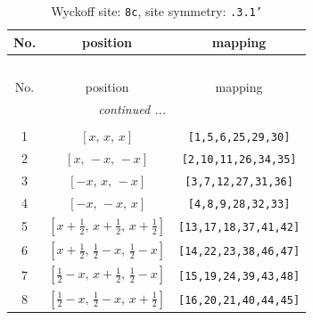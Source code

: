 \documentclass[fleqn,8pt]{jsarticle}
\begin{document}
\renewcommand{\arraystretch}{1.2}
\begin{longtable}{ccc}
\caption{Wyckoff site: {\tt 8c}, site symmetry: {\tt .3.1'}}
 \\
 \hline \hline
No. & position & mapping \\ \hline \endfirsthead

\multicolumn{2}{l}{\tablename\ \thetable{}} \\
 \hline \hline
No. & position & mapping \\ \hline \endhead

 \hline \hline
\multicolumn{2}{r}{\footnotesize\it continued ...} \\ \endfoot

 \hline \hline
\multicolumn{2}{r}{} \\ \endlastfoot

1 & $\left[ x,\, x,\, x \right]$ & {\tt [1,5,6,25,29,30]} \\ \hline
2 & $\left[ x,\, - x,\, - x \right]$ & {\tt [2,10,11,26,34,35]} \\ \hline
3 & $\left[ - x,\, x,\, - x \right]$ & {\tt [3,7,12,27,31,36]} \\ \hline
4 & $\left[ - x,\, - x,\, x \right]$ & {\tt [4,8,9,28,32,33]} \\ \hline
5 & $\left[ x + \frac{1}{2},\, x + \frac{1}{2},\, x + \frac{1}{2} \right]$ & {\tt [13,17,18,37,41,42]} \\ \hline
6 & $\left[ x + \frac{1}{2},\, \frac{1}{2} - x,\, \frac{1}{2} - x \right]$ & {\tt [14,22,23,38,46,47]} \\ \hline
7 & $\left[ \frac{1}{2} - x,\, x + \frac{1}{2},\, \frac{1}{2} - x \right]$ & {\tt [15,19,24,39,43,48]} \\ \hline
8 & $\left[ \frac{1}{2} - x,\, \frac{1}{2} - x,\, x + \frac{1}{2} \right]$ & {\tt [16,20,21,40,44,45]} \\
\end{longtable}
\renewcommand{\arraystretch}{1.2}
\end{document}
